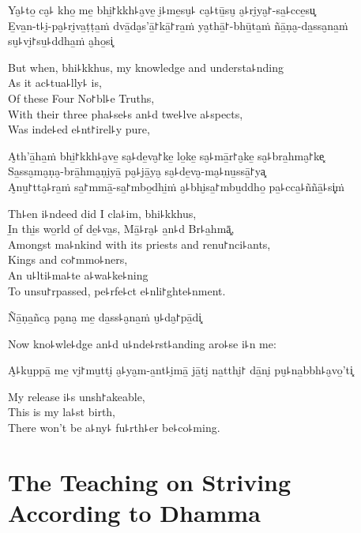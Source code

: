 Ya̮꜕to̱ ca̮꜕ kho̱ me̱ bhi̱꜓kkh꜕a̮ve̱ i̮꜕me̱su̮꜕ ca̮꜕tū̱su̮ a̮꜕ri̮ya̮꜓-sa̱꜕cce̱su͓\\
E̱va̱n-t꜕i̮-pa̮꜕ri̮va̱ṭṭa̱ṁ dvā̱da̮s'ā̱꜓kā̱꜓ra̱ṁ ya̮thā̱꜓-bhū̱ta̱ṁ ñā̱ṇa̮-da̱ssa̮na̱ṁ su̮꜕vi̮꜓su̱꜕ddha̱ṁ a̮ho̱si͓

\begin{english}
  But when, bhi꜕kkhus, my knowledge and understa꜕nding\\
  As it ac꜕tua꜕lly꜕ is,\\
  Of these Four No꜓bl꜕e Truths,\\
  With their three pha꜕se꜕s an꜕d twe꜕lve a꜕spects,\\
  Was inde꜕ed e꜕nt꜓irel꜕y pure,
\end{english}

A̮th'ā̱ha̱ṁ bhi̱꜓kkh꜕a̮ve̱ sa̮꜕de̱va̮꜓ke̱ lo̱ke̱ sa̮꜕mā̱r꜓a̮ke̱ sa̮꜕bra̱hma̮꜓ke͓\\
Sa̱ssa̮ma̮ṇa̮-brā̱hma̮ṇi̮yā̱ pa̮꜕jā̱ya̮ sa̮꜕de̱va̮-ma̮꜕nu̱ssā̱꜓ya͓\\
A̮nu̱꜓tta̮꜕ra̱ṁ sa̱꜓mmā̱-sa̱꜓mbo̱dhi̱ṁ a̮꜕bhi̮sa̱꜓mbu̱ddho̱ pa̱꜕cca̱꜕ññā̱꜕si͓ṁ

\begin{english}
  Th꜕en i꜕ndeed did I cla꜕im, bhi꜕kkhus,\\
  I̱n thi̱s wo̱rld o̱f de̱꜕va̱s, Mā̱꜕ra̮꜕ a̱n꜕d Br꜕a̱hmā͓,\\
  Amongst ma꜕nkind with its priests and renu꜓nci꜕ants,\\
  Kings and co꜓mmo꜕ners,\\
  An u꜕lti꜕ma꜕te a꜕wa꜕ke꜕ning\\
  To unsu꜓rpassed, pe꜕rfe꜕ct e꜕nli꜓ghte꜕nment.
\end{english}

Ñā̱ṇa̱ñca̮ pa̮na̮ me̱ da̱ss꜕a̮na̱ṁ u̮꜕da̮꜓pā̱di͓

\begin{english}
  Now kno꜕wle꜕dge an꜕d u꜕nde꜕rst꜕anding aro꜕se i꜕n me:
\end{english}

\ifaivedition
\clearpage
\fi

A̮꜕ku̱ppā̱ me̱ vi̮꜓mu̱tti̮ a̮꜕ya̮m-a̱nt꜕i̮mā̱ jā̱ti̮ na̱tthi̮꜓ dā̱ni̮ pu̮꜕na̱bbh꜕a̮vo̱'ti͓

\begin{english}
  My release i꜕s unsh꜓akeable,\\
  This is my la꜕st birth,\\
  There won't be a꜕ny꜕ fu꜕rth꜕er be꜕co꜕ming.
\end{english}

\chapter[Striving According to Dhamma]{The Teaching on Striving According to Dhamma}

